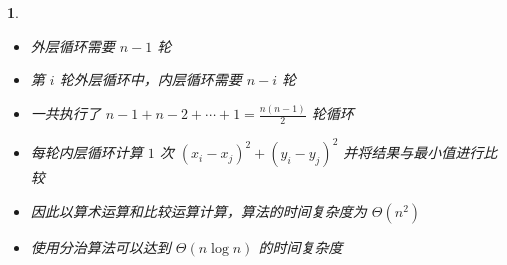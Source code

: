\documentclass[UTF8]{report}
\theoremstyle{MyLineTheoremStyle} %
\theoremstyle{MyBlockTheoremStyle} %
\theoremstyle{MySubsubsectionStyle} %
\newtheorem{definition}{}
\begin{document}
\begin{definition}
    \begin{itemize}
        \item 外层循环需要 $n - 1$ 轮
        \item 第 $i$ 轮外层循环中，内层循环需要 $n - i$ 轮
        \item 一共执行了 $n - 1 + n - 2 + \cdots + 1 = \frac{n(n-1)}{2}$ 轮循环
        \item 每轮内层循环计算 $1$ 次 $(x_i - x_j)^2 + (y_i - y_j)^2$ 并将结果与最小值进行比较
        \item 因此以算术运算和比较运算计算，算法的时间复杂度为 $\Theta(n^2)$
        \item 使用分治算法可以达到 $\Theta(n \log n)$ 的时间复杂度
    \end{itemize}
\end{definition}
\end{document}
